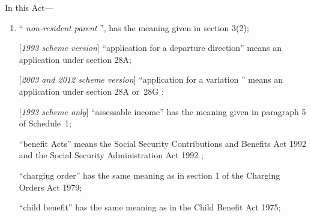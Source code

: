 \documentclass[12pt,a4paper]{article}
\begin{document}
In this Act—
\begin{enumerate}\item[]
    “%
\emph{non-resident parent}%
”, has the meaning given in section 3(2);



[\emph{1993 scheme version}] “application for a departure direction” means an application under section 28A;

[\emph{2003 and 2012 scheme version}] “application for a 
variation%
” means an application under section 28A
or~28G%
;

[\emph{1993 scheme only}]     “assessable income” has the meaning given in paragraph 5 of Schedule~1;

    “benefit Acts” means the 
Social Security Contributions and Benefits Act 1992 and the Social Security Administration Act 1992%
;

“charging order” has the same meaning as in section 1 of the Charging Orders Act 1979;



    “child benefit” has the same meaning as in the Child Benefit Act 1975;



\end{enumerate}
\end{document}
